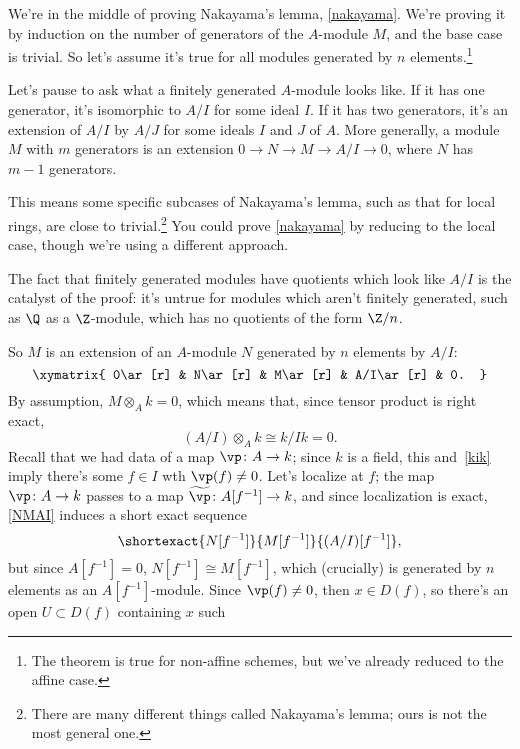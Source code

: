 We're in the middle of proving Nakayama's lemma, \cref{nakayama}. We're proving it by induction on the number of
generators of the $A$-module $M$, and the base case is trivial. So let's assume it's true for all modules generated
by $n$ elements.\footnote{The theorem is true for non-affine schemes, but we've already reduced to the affine
case.}
\begin{rem}
Let's pause to ask what a finitely generated $A$-module looks like. If it has one generator, it's isomorphic to
$A/I$ for some ideal $I$. If it has two generators, it's an extension of $A/I$ by $A/J$ for some ideals $I$ and $J$
of $A$. More generally, a module $M$ with $m$ generators is an extension $0\to N\to M\to A/I\to 0$, where $N$ has
$m-1$ generators.

This means some specific subcases of Nakayama's lemma, such as that for local rings, are close to
trivial.\footnote{There are many different things called Nakayama's lemma; ours is not the most general one.} You
could prove \cref{nakayama} by reducing to the local case, though we're using a different approach.

The fact that finitely generated modules have quotients which look like $A/I$ is the catalyst of the proof: it's
untrue for modules which aren't finitely generated, such as $\Q$ as a $\Z$-module, which has no quotients of the
form $\Z/n$.
\end{rem}
So $M$ is an extension of an $A$-module $N$ generated by $n$ elements by $A/I$:
\begin{equation}
\label{NMAI}
\xymatrix{
	0\ar[r] & N\ar[r] & M\ar[r] & A/I\ar[r] & 0.
}
\end{equation}
By assumption, $M\otimes_A k = 0$, which means that, since tensor product is right exact,
\begin{equation}
\label{kik}
	(A/I)\otimes_A k \cong k/Ik = 0.
\end{equation}
Recall that we had data of a map $\vp\colon A\to k$; since $k$ is a field, this and~\eqref{kik} imply there's some
$f\in I$ wth $\vp(f)\ne 0$. Let's localize at $f$; the map $\vp\colon A\to k$ passes to a map $\widetilde\vp\colon
A[f^{-1}]\to k$, and since localization is exact, \eqref{NMAI} induces a short exact sequence
\begin{equation}
	\shortexact{N[f^{-1}]}{M[f^{-1}]}{(A/I)[f^{-1}]},
\end{equation}
but since $A[f^{-1}] = 0$, $N[f^{-1}]\cong M[f^{-1}]$, which (crucially) is generated by $n$ elements as an
$A[f^{-1}]$-module. Since $\vp(f)\ne 0$, then $x\in D(f)$, so there's an open $U\subset D(f)$ containing $x$ such

